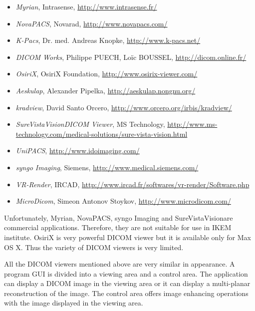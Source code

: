 \begin{itemize}
  \setlength{\itemsep}{0pt}
  \setlength{\parskip}{0pt}
  \setlength{\parsep}{0pt}
\item \emph{Myrian}, Intrasense, \url{http://www.intrasense.fr/}
\item \emph{NovaPACS}, Novarad, \url{http://www.novapacs.com/}
\item \emph{K-Pacs}, Dr. med. Andreas Knopke, \url{http://www.k-pacs.net/}
\item \emph{DICOM Works}, Philippe PUECH, Loïc BOUSSEL, \url{http://dicom.online.fr/}
\item \emph{OsiriX}, OsiriX Foundation, \url{http://www.osirix-viewer.com/}
\item \emph{Aeskulap}, Alexander Pipelka, \url{http://aeskulap.nongnu.org/}
\item \emph{kradview}, David Santo Orcero, \url{http://www.orcero.org/irbis/kradview/}
\item \emph{SureVistaVision\texttrademark DICOM Viewer}, MS Technology, \url{http://www.ms-technology.com/medical-solutions/sure-vista-vision.html}
\item \emph{UniPACS},  \url{http://www.idoimaging.com/}
\item \emph{syngo Imaging}, Siemens, \url{http://www.medical.siemens.com/}
\item \emph{VR-Render}, IRCAD, \url{http://www.ircad.fr/softwares/vr-render/Software.php}
\item \emph{MicroDicom}, Simeon Antonov Stoykov, \url{http://www.microdicom.com/}
\end{itemize}

Unfortunately, Myrian, NovaPACS, syngo Imaging and SureVistaVision\texttrademark are commercial applications. Therefore, they are not suitable for use in IKEM institute. OsiriX is very powerful DICOM viewer but it is available only for Max OS X. Thus the variety of DICOM viewers is very limited.

All the DICOM viewers mentioned above are very similar in appearance. A program GUI is divided into a viewing area and a control area. The application can display a DICOM image in the viewing area or it can display a multi-planar reconstruction of the image. The control area offers image enhancing operations with the image displayed in the viewing area.

